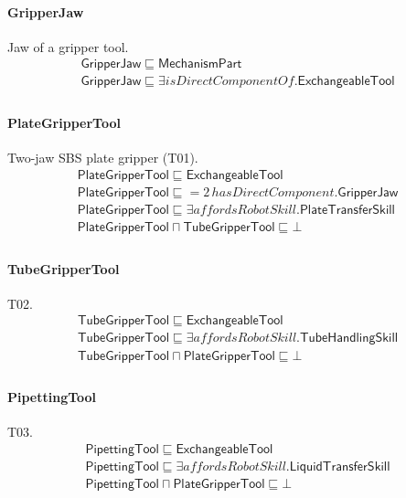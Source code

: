 \documentclass[10pt]{article}
\begin{document}
\paragraph{GripperJaw} Jaw of a gripper tool.
\[\begin{array}{l}
\mathsf{GripperJaw} \sqsubseteq  \mathsf{MechanismPart} \\
\mathsf{GripperJaw} \sqsubseteq  \exists \mathit{isDirectComponentOf}.\mathsf{ExchangeableTool} \\
\end{array}\]
\paragraph{PlateGripperTool} Two-jaw SBS plate gripper (T01).
\[\begin{array}{l}
\mathsf{PlateGripperTool} \sqsubseteq  \mathsf{ExchangeableTool} \\
\mathsf{PlateGripperTool} \sqsubseteq  {=}2\, \mathit{hasDirectComponent}.\mathsf{GripperJaw} \\
\mathsf{PlateGripperTool} \sqsubseteq  \exists \mathit{affordsRobotSkill}.\mathsf{PlateTransferSkill} \\
\mathsf{PlateGripperTool} \sqcap  \mathsf{TubeGripperTool} \sqsubseteq  \bot  \\
\end{array}\]
\paragraph{TubeGripperTool} T02.
\[\begin{array}{l}
\mathsf{TubeGripperTool} \sqsubseteq  \mathsf{ExchangeableTool} \\
\mathsf{TubeGripperTool} \sqsubseteq  \exists \mathit{affordsRobotSkill}.\mathsf{TubeHandlingSkill} \\
\mathsf{TubeGripperTool} \sqcap  \mathsf{PlateGripperTool} \sqsubseteq  \bot  \\
\end{array}\]
\paragraph{PipettingTool} T03.
\[\begin{array}{l}
\mathsf{PipettingTool} \sqsubseteq  \mathsf{ExchangeableTool} \\
\mathsf{PipettingTool} \sqsubseteq  \exists \mathit{affordsRobotSkill}.\mathsf{LiquidTransferSkill} \\
\mathsf{PipettingTool} \sqcap  \mathsf{PlateGripperTool} \sqsubseteq  \bot  \\
\end{array}\]
\end{document}
